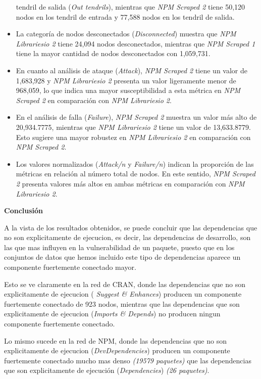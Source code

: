\begin{itemize}
          tendril de salida (\textit{Out tendrils}), mientras que \textit{NPM Scraped 2} tiene
          50,120 nodos en los tendril de entrada y 77,588 nodos en los tendril de salida.
    \item La categoría de nodos desconectados (\textit{Disconnected}) muestra que
          \textit{NPM Librariesio 2} tiene 24,094 nodos desconectados, mientras que
          \textit{NPM Scraped 1} tiene la mayor cantidad de nodos desconectados con
          1,059,731.
    \item En cuanto al análisis de ataque (\textit{Attack}), \textit{NPM Scraped 2} tiene
          un valor de 1,683,928 y \textit{NPM Librariesio 2} presenta un valor ligeramente menor
          de 968,059, lo que indica una mayor susceptibilidad a esta métrica en \textit{NPM Scraped 2}
          en comparación con \textit{NPM Librariesio 2}.
    \item En el análisis de falla (\textit{Failure}), \textit{NPM Scraped 2} muestra un valor
          más alto de 20,934.7775, mientras que \textit{NPM Librariesio 2} tiene un valor de
          13,633.8779. Esto sugiere una mayor robustez en \textit{NPM Librariesio 2} en comparación
          con \textit{NPM Scraped 2}.
    \item Los valores normalizados (\textit{Attack/n} y \textit{Failure/n}) indican la
          proporción de las métricas en relación al número total de nodos. En este sentido,
          \textit{NPM Scraped 2} presenta valores más altos en ambas métricas en comparación
          con \textit{NPM Librariesio 2}.
\end{itemize}

\textbf{Conclusión}

A la vista de los resultados obtenidos, se puede concluir que las dependencias que no son explicitamente de
ejecucion, es decir, las dependencias de desarrollo, son las que mas influyen en la vulnerabilidad de un paquete, puesto
que en los conjuntos de datos que hemos incluido este tipo de dependencias aparece un componente fuertemente conectado mayor.

Esto se ve claramente en la red de CRAN, donde las dependencias que no son explicitamente de ejecucion (\textit{ Suggest \& Enhances})
producen un componente fuertemente conectado de 923 nodos, mientras que las dependencias que son explicitamente de ejecucion
(\textit{Imports \& Depends}) no producen ningun componente fuertemente conectado.

Lo mismo sucede en la red de NPM, donde las dependencias que no son explicitamente de ejecucion (\textit{DevDependencies})
producen un componente fuertemente conectado mucho mas denso \textit{(19579 paquetes)} que las dependencias que son explicitamente de ejecución
(\textit{Dependencies}) \textit{(26 paquetes)}.

